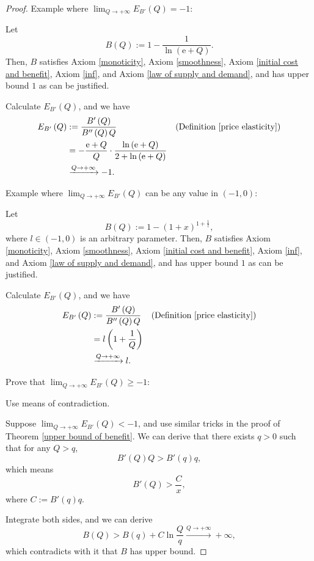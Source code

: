 \documentclass{article}
\begin{document}
\begin{proof}
Example where $\lim_{Q\to+\infty}E_{B'}\left(Q\right)=-1$:

Let
$$B\left(Q\right):=1-\frac1{\ln\left(\mathrm e+Q\right)}.$$
Then, $B$ satisfies Axiom \ref{monoticity}, Axiom \ref{smoothness}, Axiom \ref{initial cost and benefit}, Axiom \ref{inf}, and Axiom \ref{law of supply and demand}, and has upper bound $1$ as can be justified.

Calculate $E_{B'}\left(Q\right)$, and we have
\begin{align*}
E_{B'}\left(Q\right)&:=\frac{B'\left(Q\right)}{B''\left(Q\right)Q}&&\text{(Definition \ref{price elasticity})}\\
&=-\frac{\mathrm e+Q}Q\cdot\frac{\ln\left(\mathrm e+Q\right)}{2+\ln\left(\mathrm e+Q\right)}\\
&\xrightarrow{Q\to+\infty}-1.
\end{align*}

Example where $\lim_{Q\to+\infty}E_{B'}\left(Q\right)$ can be any value in $\left(-1,0\right)$:

Let
$$B\left(Q\right):=1-\left(1+x\right)^{1+\frac1l},$$
where $l\in\left(-1,0\right)$ is an arbitrary parameter.
Then, $B$ satisfies Axiom \ref{monoticity}, Axiom \ref{smoothness}, Axiom \ref{initial cost and benefit}, Axiom \ref{inf}, and Axiom \ref{law of supply and demand}, and has upper bound $1$ as can be justified.

Calculate $E_{B'}\left(Q\right)$, and we have
\begin{align*}
E_{B'}\left(Q\right)&:=\frac{B'\left(Q\right)}{B''\left(Q\right)Q}&&\text{(Definition \ref{price elasticity})}\\
&=l\left(1+\frac1Q\right)\\
&\xrightarrow{Q\to+\infty}l.
\end{align*}

Prove that $\lim_{Q\to+\infty}E_{B'}\left(Q\right)\ge-1$:

Use means of contradiction.

Suppose $\lim_{Q\to+\infty}E_{B'}\left(Q\right)<-1$,
and use similar tricks in the proof of Theorem \ref{upper bound of benefit}.
We can derive that there exists $q>0$ such that for any $Q>q$,
$$B'\left(Q\right)Q>B'\left(q\right)q,$$
which means
$$B'\left(Q\right)>\frac Cx,$$
where $C:=B'\left(q\right)q$.

Integrate both sides, and we can derive
$$B\left(Q\right)>B\left(q\right)+C\ln\frac Qq\xrightarrow{Q\to+\infty}+\infty,$$
which contradicts with it that $B$ has upper bound.
\end{proof}
\end{document}
